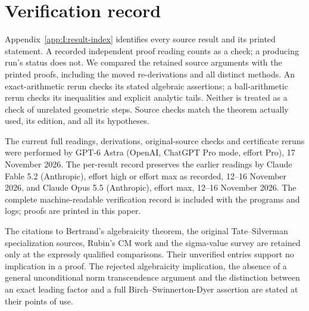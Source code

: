 \clearpage
\section{Verification record}
\label{sec:I:verification}
Appendix~\ref{app:I:result-index} identifies every source result and its
printed statement. A recorded independent proof reading counts as a check;
a producing run's status does not. We compared the retained source arguments
with the printed proofs, including the moved re-derivations and all distinct
methods. An exact-arithmetic rerun checks its stated algebraic assertions;
a ball-arithmetic rerun checks its inequalities and explicit analytic tails.
Neither is treated as a check of unrelated geometric steps. Source checks
match the theorem actually used, its edition, and all its hypotheses.

The current full readings, derivations, original-source checks and
certificate reruns were performed by GPT-6 Astra (OpenAI, ChatGPT Pro mode,
effort Pro), 17 November 2026. The per-result record preserves the earlier
readings by Claude Fable 5.2 (Anthropic), effort high or effort max as recorded,
12--16 November 2026, and Claude Opus 5.5 (Anthropic), effort max,
12--16 November 2026. The complete machine-readable verification record is
included with the programs and logs; proofs are printed in this paper.

The citations to Bertrand's algebraicity theorem, the original
Tate--Silverman specialization sources, Rubin's CM work and the sigma-value
survey are retained only at the expressly qualified comparisons. Their
unverified entries support no implication in a proof. The rejected
algebraicity implication, the absence of a general unconditional norm
transcendence argument and the distinction between an exact leading factor
and a full Birch--Swinnerton-Dyer assertion are stated at their points of use.

